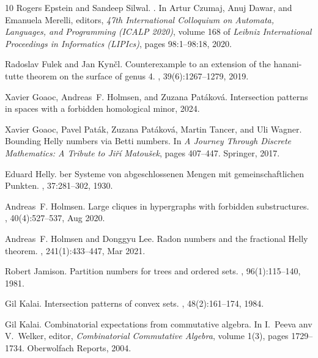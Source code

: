 \documentclass[a4paper,UKenglish,thm-restate]{article}
\begin{document}
\begin{thebibliography}{10}
Rogers Epstein and Sandeep Silwal.
.
\newblock In Artur Czumaj, Anuj Dawar, and Emanuela Merelli, editors, {\em 47th
  International Colloquium on Automata, Languages, and Programming (ICALP
  2020)}, volume 168 of {\em Leibniz International Proceedings in Informatics
  (LIPIcs)}, pages 98:1--98:18, 2020.

Radoslav Fulek and Jan Kyn{\v{c}}l.
\newblock Counterexample to an extension of the hanani-tutte theorem on the
  surface of genus 4.
, 39(6):1267--1279, 2019.

Xavier Goaoc, Andreas~F. Holmsen, and Zuzana Patáková.
\newblock Intersection patterns in spaces with a forbidden homological minor,
  2024.

Xavier Goaoc, Pavel Pat{\'a}k, Zuzana Pat{\'a}kov{\'a}, Martin Tancer, and Uli
  Wagner.
\newblock Bounding {H}elly numbers via {B}etti numbers.
\newblock In {\em A Journey Through Discrete Mathematics: A Tribute to
  Ji{\v{r}}{\'i} Matou{\v{s}}ek}, pages 407--447. Springer, 2017.

Eduard Helly.
ber {S}ysteme von abgeschlossenen {M}engen mit
  gemeinschaftlichen {P}unkten.
, 37:281--302, 1930.

Andreas~F. Holmsen.
\newblock Large cliques in hypergraphs with forbidden substructures.
, 40(4):527--537, Aug 2020.

Andreas~F. Holmsen and Donggyu Lee.
\newblock Radon numbers and the fractional {H}elly theorem.
, 241(1):433--447, Mar 2021.

Robert Jamison.
\newblock Partition numbers for trees and ordered sets.
, 96(1):115--140, 1981.

Gil Kalai.
\newblock Intersection patterns of convex sets.
, 48(2):161--174, 1984.

Gil Kalai.
\newblock Combinatorial expectations from commutative algebra.
\newblock In I.~Peeva anv V.~Welker, editor, {\em Combinatorial Commutative
  Algebra}, volume 1(3), pages 1729--1734. Oberwolfach Reports, 2004.


\end{thebibliography}
\end{document}
